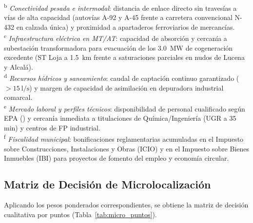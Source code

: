 \documentclass{report}
\begin{document}
\begin{table}[H]
{    \textsuperscript{b} \textit{Conectividad pesada e intermodal}: distancia de enlace directo sin travesías a vías de alta capacidad (autovías A-92 y A-45 frente a carretera convencional N-432 en calzada única) y proximidad a apartaderos ferroviarios de mercancías.\\
    \textsuperscript{c} \textit{Infraestructura eléctrica en MT/AT}: capacidad de absorción y cercanía a subestación transformadora para evacuación de los \SI{3.0}{\mega\watt} de cogeneración excedente (ST Loja a \SI{1.5}{\kilo\metre} frente a saturaciones parciales en nudos de Lucena y Alcalá).\\
    \textsuperscript{d} \textit{Recursos hídricos y saneamiento}: caudal de captación continuo garantizado ($> \SI{15}{\litre/\second}$) y margen de capacidad de asimilación en depuradora industrial comarcal.\\
    \textsuperscript{e} \textit{Mercado laboral y perfiles técnicos}: disponibilidad de personal cualificado según EPA (\autocite{INE_EPA2026}) y cercanía inmediata a titulaciones de Química/Ingeniería (UGR a 35 min) y centros de FP industrial.\\
    \textsuperscript{f} \textit{Fiscalidad municipal}: bonificaciones reglamentarias acumuladas en el Impuesto sobre Construcciones, Instalaciones y Obras (ICIO) y en el Impuesto sobre Bienes Inmuebles (IBI) para proyectos de fomento del empleo y economía circular.}
\end{table}

\subsection{Matriz de Decisión de Microlocalización}
Aplicando los pesos ponderados correspondientes, se obtiene la matriz de decisión cualitativa por puntos (Tabla~\ref{tab:micro_puntos}).
\end{document}
